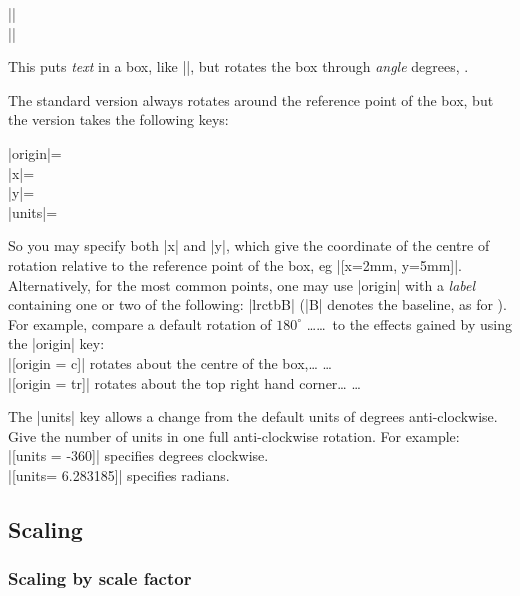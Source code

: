 \begin{decl}
\gs |\rotatebox|\\
\gx |\rotatebox|
\end{decl}

This puts \emph{text} in a box, like |\mbox|, but rotates the box
through \emph{angle} degrees, .

The standard version always rotates around the reference point of the
box, but the  version takes the following keys:

\begin{decl}
|origin|=\\
|x|=\\
|y|=\\
|units|=
\end{decl}

So you may specify both |x| and |y|, which give the coordinate of
the centre of rotation relative to the reference point of the box, eg
|[x=2mm, y=5mm]|. Alternatively, for the most common points, one may use
|origin| with a \emph{label} containing one or two of the following:
|lrctbB| (|B| denotes the baseline, as for ). For
example, compare a default rotation of $180^\circ$
\ldots{}\ldots\ to the effects gained by using
the |origin| key:\\
|[origin = c]| rotates about the centre of the box,\ldots
         \ldots\\
|[origin = tr]| rotates about the top right hand corner\ldots
                   \ldots

The |units| key allows a change from the default units of degrees
anti-clockwise. Give the number of units in one full anti-clockwise
rotation. For example:\\
|[units = -360]| specifies degrees clockwise.\\
|[units= 6.283185]| specifies radians.

\subsection{Scaling}

\subsubsection{Scaling by scale factor}


